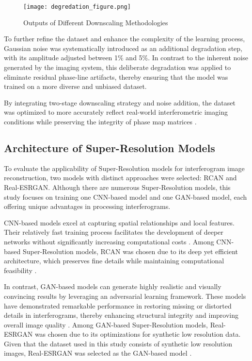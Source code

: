 \documentclass[10pt,twocolumn]{article}
\begin{document}
\begin{figure}[ht]
    \centering
    \vspace{-0.3cm}
    \texttt{[image: degredation\_figure.png]}
    \vspace{-0.8cm}
    \caption{\centering Outputs of Different Downscaling Methodologies }
    \label{fig:downscale}
\end{figure}

To further refine the dataset and enhance the complexity of the learning process, Gaussian noise was systematically introduced as an additional degradation step, with its amplitude adjusted between 1\% and 5\%. In contrast to the inherent noise generated by the imaging system, this deliberate degradation was applied to eliminate residual phase-line artifacts, thereby ensuring that the model was trained on a more diverse and unbiased dataset.

By integrating two-stage downscaling strategy and noise addition, the dataset was optimized to more accurately reflect real-world interferometric imaging conditions while preserving the integrity of phase map matrices \cite{JiRealSR}.

\subsection{Architecture of Super-Resolution Models}
To evaluate the applicability of Super-Resolution models for interferogram image reconstruction, two models with distinct approaches were selected: RCAN and Real-ESRGAN. Although there are numerous Super-Resolution models, this study focuses on training one CNN-based model and one GAN-based model, each offering unique advantages in processing interferograms.

CNN-based models excel at capturing spatial relationships and local features. Their relatively fast training process facilitates the development of deeper networks without significantly increasing computational costs \cite{Lecun2015,Lecun1998}. Among CNN-based Super-Resolution models, RCAN was chosen due to its deep yet efficient architecture, which preserves fine details while maintaining computational feasibility \cite{Zhang2018}.

In contrast, GAN-based models can generate highly realistic and visually convincing results by leveraging an adversarial learning framework. These models have demonstrated remarkable performance in restoring missing or distorted details in interferograms, thereby enhancing structural integrity and improving overall image quality \cite{Geyer2023}. Among GAN-based Super-Resolution models, Real-ESRGAN was chosen due to its optimizations for synthetic low resolution data. Given that the dataset used in this study consists of synthetic low resolution images, Real-ESRGAN was selected as the GAN-based model \cite{Wang2021}.
\end{document}
